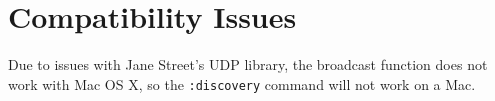 \documentclass{scrartcl}
\begin{document}
\section{Compatibility Issues}

Due to issues with Jane Street's UDP library, the broadcast function does not work with Mac OS X, so the \texttt{:discovery} command will not work on a Mac.
\end{document}

